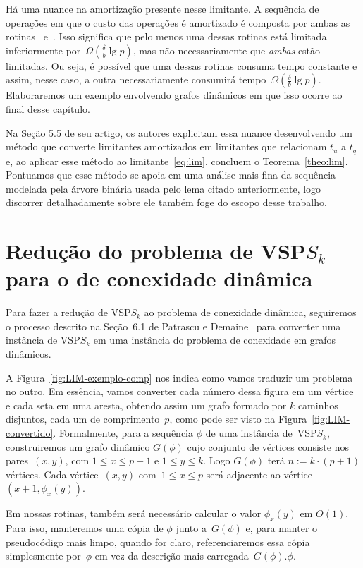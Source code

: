 Há uma nuance na amortização presente nesse limitante. A sequência de operações em que o custo das operações é amortizado é composta por ambas as rotinas~\VPSPupdate{} e~\VPSPverify. Isso significa que pelo menos uma dessas rotinas está limitada inferiormente por~$\Omega(\frac{\delta}{b}\lg p)$, mas não necessariamente que \textit{ambas} estão limitadas. Ou seja, é possível que uma dessas rotinas consuma tempo constante e assim, nesse caso, a outra necessariamente consumirá tempo~$\Omega(\frac{\delta}{b}\lg p)$. Elaboraremos um exemplo envolvendo grafos dinâmicos em que isso ocorre ao final desse capítulo. 


Na Seção 5.5 de seu artigo, os autores explicitam essa nuance desenvolvendo um método que converte limitantes amortizados em limitantes que relacionam $t_u$ a $t_q$ e, ao aplicar esse método ao limitante~\eqref{eq:lim}, concluem o Teorema~\ref{theo:lim}. Pontuamos que esse método se apoia em uma análise mais fina da sequência modelada pela árvore binária usada pelo lema citado anteriormente, logo discorrer detalhadamente sobre ele também foge do escopo desse trabalho.




\section[Redução do VSP$S_k$ para conexidade dinâmica]{Redução do problema de VSP$S_k$ para o de conexidade dinâmica}

Para fazer a redução de VSP$S_k$ ao problema de conexidade dinâmica, seguiremos o processo descrito na Seção~6.1 de Patrascu e Demaine~\cite{lowerBoundPatrascu} para  converter uma instância de VSP$S_k$ em uma instância do problema de conexidade em grafos dinâmicos. 

A Figura~\ref{fig:LIM-exemplo-comp} nos indica como vamos traduzir um problema no outro. Em essência, vamos converter cada número dessa figura em um vértice e cada seta em uma aresta, obtendo assim um grafo formado por $k$ caminhos disjuntos, cada um de comprimento~$p$, como pode ser visto na Figura~\ref{fig:LIM-convertido}. Formalmente, para a sequência $\phi$ de uma instância de~VSP$S_k$, construiremos um grafo dinâmico $G(\phi)$ cujo conjunto de vértices consiste nos pares~$(x,y)$, com $1\leqslant x \leqslant p+1$ e $1\leqslant y \leqslant k$. Logo $G(\phi)$ terá $n:=k\cdot (p+1)$ vértices. Cada vértice~$(x,y)$ com~$1\leqslant x \leqslant p$ será adjacente ao vértice~$(x+1,\phi_x(y))$. 

Em nossas rotinas, também será necessário calcular o valor $\phi_x(y)$ em $O(1)$. Para isso, manteremos uma cópia de $\phi$ junto a~$G(\phi)$ e, para manter o pseudocódigo mais limpo, quando for claro, referenciaremos essa cópia simplesmente por~$\phi$ em vez da descrição mais carregada~$G(\phi).\phi$.


